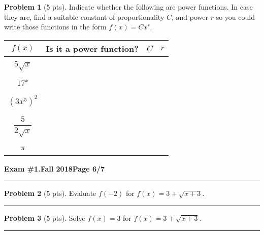 \documentclass[12pt]{article}
\theoremstyle{definition}
\newtheorem{problem}{Problem}
\begin{document}
\begin{problem}[5 pts]
  Indicate whether the following are power functions. In case they are, find a suitable constant of proportionality $C$,
  and power $r$ so you could write those functions in the form $f(x) = Cx^r$. 
  \begin{center}
    \begin{tabular}{|c|c|c|c|}
      \hline
      $f(x)$ & Is it a power function? & $C$ & $r$ \\
      \hline
      \hline
             &&& \\
      $5\sqrt{x}$ &&\hspace{1cm} & \hspace{1cm} \\
             &&& \\
      \hline
             &&& \\
      $17^x$ &&& \\
             &&& \\
      \hline
             &&& \\
      $(3x^5)^2$ &&& \\
             &&& \\
      \hline
             &&& \\
      $\dfrac{5}{2\sqrt{x}}$ &&& \\
             &&& \\
      \hline
             &&& \\
      $\pi$ &&& \\
             &&& \\
      \hline
    \end{tabular}
  \end{center}
\end{problem}
\newpage


\hfill{\large\bf Exam \#1.}\hfill{\large\bf  Fall 2018}\hfill{\large\bf Page 6/7}\hrule

\bigskip
\begin{problem}[5 pts]
  Evaluate $f(-2)$ for $f(x) = 3+\sqrt{x+3}$.

  \vspace{2cm}
\end{problem}
\hrule

\begin{problem}[5 pts]
  Solve $f(x)=3$ for $f(x) = 3+\sqrt{x+3}$.

  \vspace{2cm}
\end{problem}
\hrule
\end{document}
